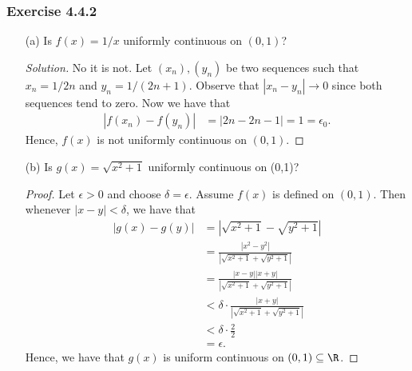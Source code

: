 \subsubsection{Exercise 4.4.2} 
\begin{enumerate}
    \item[(a)] Is \( f(x) = 1 / x  \) uniformly continuous on \( (0,1) \)? 
        \begin{proof}[Solution]
        No it is not. Let \( (x_n), (y_n)  \) be two sequences such that \( x_n = 1 / 2n \) and \( y_n = 1 / (2n+1) \). Observe that \( | x_n - y_n  | \to 0  \) since both sequences tend to zero. Now we have that 
        \begin{align*}
            | f(x_n) - f(y_n) | &= | 2n - 2n - 1  |
                                = 1 = \epsilon_0.
        \end{align*}
        Hence, \( f(x)  \) is not uniformly continuous on \( (0,1) \).
        \end{proof}
    \item[(b)] Is \( g(x) = \sqrt{ x^2 + 1  }  \) uniformly continuous on (0,1)?
        \begin{proof}
        Let \( \epsilon > 0  \) and choose \( \delta = \epsilon. \) Assume \( f(x) \) is defined on \( (0,1)  \). Then whenever \( | x - y  | < \delta  \), we have that 
            \begin{align*}
                | g(x) - g(y) | &= | \sqrt{ x^2 + 1  } - \sqrt{ y^2 + 1  }  |  \\
                                &=  \frac{ | x^2 - y^2  |  }{ | \sqrt{ x^2 + 1  } + \sqrt{ y^2 + 1  }  |  }   \\
                                &=  \frac{ | x - y  | | x + y  |  }{ | \sqrt{ x^2 + 1  } + \sqrt{ y^2 + 1  }   |  }  \\  
                                &< \delta \cdot \frac{ | x+ y  |  }{ |  \sqrt{ x^2 + 1  } + \sqrt{ y^2 + 1  }   |  }  \\
                                &< \delta \cdot \frac{ 2 }{ 2 }  \\
                                &= \epsilon .
            \end{align*}
            Hence, we have that \( g(x)  \) is uniform continuous on \( (0,1) \subseteq \R  \).
        \end{proof}
\end{enumerate}


